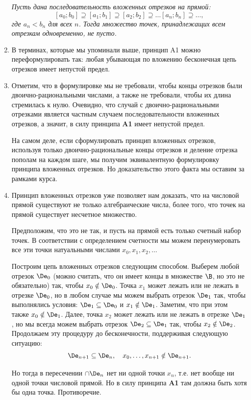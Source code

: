 \begin{enumerate}
\noindent
\textit{Пусть дана последовательность вложенных отрезков на прямой:
$$
[a_0;b_0]\supseteq[a_1;b_1]\supseteq[a_2;b_2]\supseteq\dots[a_n;b_n]\supseteq\dots,
$$
где $a_n<b_n$ для всех $n$. Тогда множество точек, принадлежащих всем отрезкам одновременно, не пусто.}
\item В терминах, которые мы упоминали выше, принцип A1 можно переформулировать так: любая убывающая по вложению бесконечная цепь отрезков имеет непустой предел.
\item Отметим, что в формулировке мы не требовали, чтобы концы отрезков были двоично-рациональными числами, а также не требовали, чтобы их длина стремилась к нулю. Очевидно, что случай с двоично-рациональными отрезками является частным случаем последовательности вложенных отрезков, а значит, в силу принципа \textbf{A1} имеет непустой предел.

На самом деле, если сформулировать принцип вложенных отрезков, используя только двоично-рациональные концы отрезков и деление отрезка пополам на каждом шаге, мы получим эквивалентную формулировку принципа вложенных отрезков. Но доказательство этого факта мы оставим за рамками курса.
\item Принцип вложенных отрезков уже позволяет нам доказать, что на числовой прямой существуют не только алгебраические числа, более того, что точек на прямой существует несчетное множество.

Предположим, что это не так, и пусть на прямой есть только счетный набор точек. В соответствии с определением счетности мы можем перенумеровать все эти точки натуальными числами $x_0,x_1,x_2,\dots$

Построим цепь вложенных отрезков следующим способом. Выберем любой отрезок $\De_0$ (можно считать, что он имеет концы в множестве $\B$, но это не обязательно) так, чтобы $x_0\notin\De_0$. Точка $x_1$ может лежать или не лежать в отрезке $\De_0$, но в любом случае мы можем выбрать отрезок $\De_1$ так, чтобы выполнялись условия: $\De_1\subseteq\De_0$ и $x_1\notin\De_1$. Заметим, что при этом также $x_0\notin\De_1$. Далее, точка $x_2$ может лежать или не лежать в отрезке $\De_1$, но мы всегда можем выбрать отрезок $\De_2\subseteq\De_1$ так, чтобы $x_2\notin\De_2$. Продолжаем эту процедуру до бесконечности, поддерживая следующую ситуацию:
$$
\De_{n+1}\subseteq\De_n,\quad x_0,\dots,x_{n+1}\notin\De_{n+1}.
$$

Но тогда в пересечении $\cap\De_n$ нет ни одной точки $x_n$, т.е. нет вообще ни одной точки числовой прямой. Но в силу принципа \textbf{A1} там должна быть хотя бы одна точка. Противоречие.


\end{enumerate}
